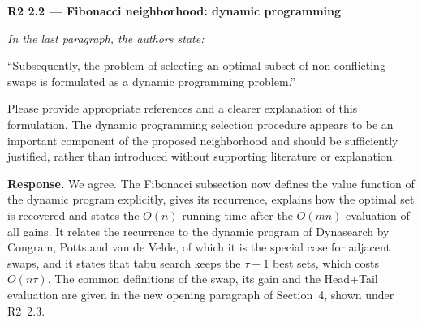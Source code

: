\documentclass[12pt]{article}
\newenvironment{rc}[1]{\par\medskip\noindent\textbf{#1}\par\nopagebreak\noindent\itshape\renewcommand{\emph}[1]{\textbf{##1}}\ignorespaces}{\par}
\newcommand{\answer}[1]{\par\smallskip\noindent\textbf{Response.} #1\par}
\begin{document}
\begin{rc}{R2 2.2 --- Fibonacci neighborhood: dynamic programming}
In the last paragraph, the authors state:

``Subsequently, the problem of selecting an optimal subset of non-conflicting swaps is formulated as a dynamic programming problem.''

Please provide appropriate references and a clearer explanation of this formulation. The dynamic programming selection procedure appears to be an important component of the proposed neighborhood and should be sufficiently justified, rather than introduced without supporting literature or explanation.
\end{rc}
\answer{We agree. The Fibonacci subsection now defines the value function of the dynamic program explicitly, gives its recurrence, explains how the optimal set is recovered and states the $O(n)$ running time after the $O(mn)$ evaluation of all gains. It relates the recurrence to the dynamic program of Dynasearch by Congram, Potts and van de Velde, of which it is the special case for adjacent swaps, and it states that tabu search keeps the $\tau+1$ best sets, which costs $O(n\tau)$. The common definitions of the swap, its gain and the Head+Tail evaluation are given in the new opening paragraph of Section~4, shown under R2~2.3.}
\end{document}
